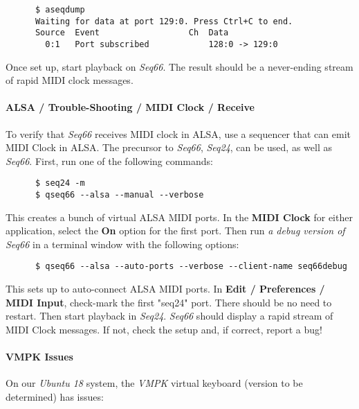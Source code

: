    \begin{verbatim}
      $ aseqdump
      Waiting for data at port 129:0. Press Ctrl+C to end.
      Source  Event                  Ch  Data
        0:1   Port subscribed            128:0 -> 129:0
   \end{verbatim}

   Once set up, start playback on \textsl{Seq66}.
   The result should be a never-ending stream of rapid MIDI clock messages.

\paragraph{ALSA / Trouble-Shooting / MIDI Clock / Receive}
\label{paragraph:alsa_testing_midi_clock_receive}

   To verify that \textsl{Seq66} receives MIDI clock in ALSA, use a sequencer
   that can emit MIDI Clock in ALSA.  The precursor to \textsl{Seq66},
   \textsl{Seq24}, can be used, as well as \textsl{Seq66}.
   First, run one of the following commands:

   \begin{verbatim}
      $ seq24 -m
      $ qseq66 --alsa --manual --verbose
   \end{verbatim}

   This creates a bunch of virtual ALSA MIDI ports.
   In the \textbf{MIDI Clock} for either application,
   select the \textbf{On} option for the first port.
   Then run \textsl{a debug version of Seq66} in a terminal window
   with the following options:

   \begin{verbatim}
      $ qseq66 --alsa --auto-ports --verbose --client-name seq66debug
   \end{verbatim}

   This sets up to auto-connect ALSA MIDI ports.  In
   \textbf{Edit / Preferences / MIDI Input}, check-mark the first
   "seq24" port.  There should be no need to restart.
   Then start playback in \textsl{Seq24}.
   \textsl{Seq66} should display a rapid stream of MIDI Clock messages.
   If not, check the setup and, if correct, report a bug!

\paragraph{VMPK Issues}
\label{paragraph:alsa_testing_vmpk_issues}

   On our \textsl{Ubuntu 18} system, the \textsl{VMPK} virtual keyboard
   (version to be determined) has issues:

